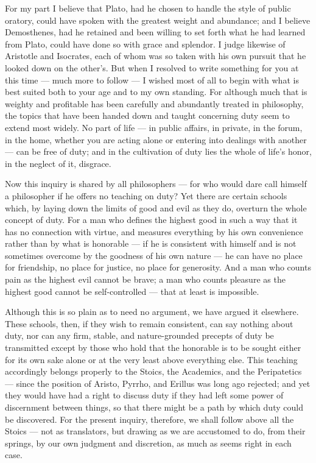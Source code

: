  For my part I believe that Plato, had he chosen to handle the style of public oratory, could have spoken with the greatest weight and abundance; and I believe Demosthenes, had he retained and been willing to set forth what he had learned from Plato, could have done so with grace and splendor. I judge likewise of Aristotle and Isocrates, each of whom was so taken with his own pursuit that he looked down on the other's. But when I resolved to write something for you at this time — much more to follow — I wished most of all to begin with what is best suited both to your age and to my own standing. For although much that is weighty and profitable has been carefully and abundantly treated in philosophy, the topics that have been handed down and taught concerning duty seem to extend most widely. No part of life — in public affairs, in private, in the forum, in the home, whether you are acting alone or entering into dealings with another — can be free of duty; and in the cultivation of duty lies the whole of life's honor, in the neglect of it, disgrace.

 Now this inquiry is shared by all philosophers — for who would dare call himself a philosopher if he offers no teaching on duty? Yet there are certain schools which, by laying down the limits of good and evil as they do, overturn the whole concept of duty. For a man who defines the highest good in such a way that it has no connection with virtue, and measures everything by his own convenience rather than by what is honorable — if he is consistent with himself and is not sometimes overcome by the goodness of his own nature — he can have no place for friendship, no place for justice, no place for generosity. And a man who counts pain as the highest evil cannot be brave; a man who counts pleasure as the highest good cannot be self-controlled — that at least is impossible.

 Although this is so plain as to need no argument, we have argued it elsewhere. These schools, then, if they wish to remain consistent, can say nothing about duty, nor can any firm, stable, and nature-grounded precepts of duty be transmitted except by those who hold that the honorable is to be sought either for its own sake alone or at the very least above everything else. This teaching accordingly belongs properly to the Stoics, the Academics, and the Peripatetics — since the position of Aristo, Pyrrho, and Erillus was long ago rejected; and yet they would have had a right to discuss duty if they had left some power of discernment between things, so that there might be a path by which duty could be discovered. For the present inquiry, therefore, we shall follow above all the Stoics — not as translators, but drawing as we are accustomed to do, from their springs, by our own judgment and discretion, as much as seems right in each case.

